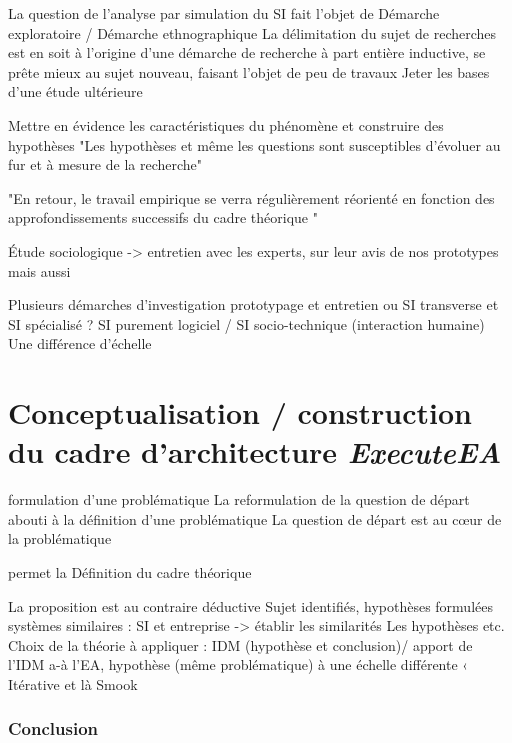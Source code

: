 La question de l'analyse par simulation du SI fait l'objet de 
Démarche exploratoire / Démarche ethnographique 
La délimitation du sujet de recherches est en soit à l'origine d'une démarche de 
recherche à part entière  inductive, se prête mieux au sujet nouveau, faisant 
l'objet de peu de travaux
Jeter les bases d'une étude ultérieure


Mettre en évidence les caractéristiques du phénomène et construire des 
hypothèses 
"Les hypothèses et même les questions sont susceptibles d'évoluer au fur et à 
mesure de la recherche"

"En retour, le travail empirique se verra régulièrement réorienté en fonction 
des approfondissements successifs du cadre théorique "

Étude sociologique -> entretien avec les experts, sur leur avis de nos 
prototypes mais aussi 

Plusieurs démarches d'investigation 
prototypage et entretien 
ou SI transverse et SI spécialisé ? SI purement logiciel / SI socio-technique 
(interaction humaine) 
Une différence d'échelle 
		 


	\section{Conceptualisation / construction du cadre d'architecture 
\textit{ExecuteEA}}
formulation d'une problématique 
La reformulation de la question de départ abouti à la définition d'une 
problématique 
La question de départ est au cœur de la problématique 

permet la Définition du cadre théorique 

La proposition est au contraire déductive
Sujet identifiés, hypothèses formulées
systèmes similaires : SI et entreprise -> établir les similarités
Les hypothèses etc.  
Choix de la théorie à appliquer : IDM (hypothèse et conclusion)/ apport de l'IDM 
a-à l'EA, hypothèse (même problématique) à une échelle différente  ‹
Itérative et là Smook 

	\subsubsection{Conclusion}
	
	
	
	
	
